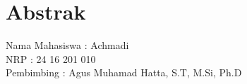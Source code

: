 \documentclass[12pt]{article}
\begin{document}
	
	
	\setcounter{page}{2}
	
	\section{Abstrak}
	
	\begin{center}
	\end{center}

	\vspace{10pt}
	
	\begin{flushleft}
		\hspace{150pt} Nama Mahasiswa : Achmadi \\
		\hspace{150pt} NRP \hspace{62pt}: 24 16 201 010 \\
		\hspace{150pt} Pembimbing \hspace{24pt}: Agus Muhamad Hatta, S.T, M.Si, Ph.D \\
	\end{flushleft}
	
	\vspace{10pt}
\end{document}
